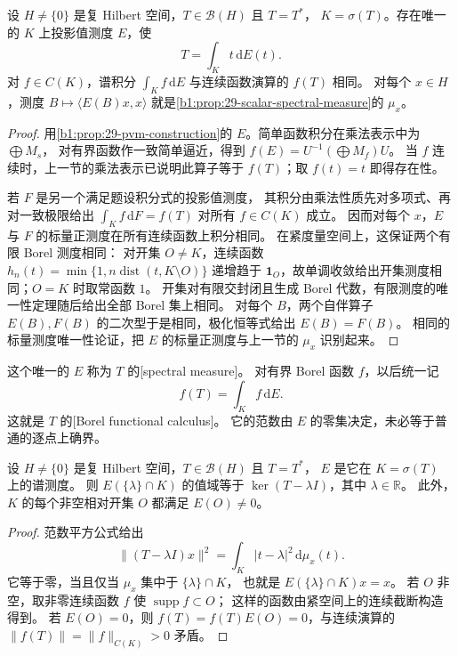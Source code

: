 \begin{theorem}[有界自伴算子的谱测度]
\label{b1:thm:29-bounded-pvm}
设 \(H\ne\{0\}\) 是复 Hilbert 空间，\(T\in\mathcal B(H)\) 且 \(T=T^*\)，
\(K=\sigma(T)\)。存在唯一的 \(K\) 上投影值测度 \(E\)，使
\[
 T=\int_K t\,\mathrm{d}E(t).
\]
对 \(f\in C(K)\)，谱积分 \(\int_K f\,\mathrm{d}E\) 与连续函数演算的 \(f(T)\) 相同。
对每个 \(x\in H\)，测度 \(B\mapsto\langle E(B)x,x\rangle\)
就是\cref{b1:prop:29-scalar-spectral-measure}的 \(\mu_x\)。
\end{theorem}
\begin{proof}
用\cref{b1:prop:29-pvm-construction}的 \(E\)。简单函数积分在乘法表示中为 \(\bigoplus M_s\)，
对有界函数作一致简单逼近，得到 \(f(E)=U^{-1}(\bigoplus M_f)U\)。
当 \(f\) 连续时，上一节的乘法表示已说明此算子等于 \(f(T)\)；取 \(f(t)=t\) 即得存在性。

若 \(F\) 是另一个满足题设积分式的投影值测度，
其积分由乘法性质先对多项式、再对一致极限给出
\(\int_K f\,\mathrm{d}F=f(T)\) 对所有 \(f\in C(K)\) 成立。
因而对每个 \(x\)，\(E\) 与 \(F\) 的标量正测度在所有连续函数上积分相同。
在紧度量空间上，这保证两个有限 Borel 测度相同：
对开集 \(O\ne K\)，连续函数
\(h_n(t)=\min\{1,n\operatorname{dist}(t,K\setminus O)\}\)
递增趋于 \(\mathbf1_O\)，故单调收敛给出开集测度相同；\(O=K\) 时取常函数 \(1\)。
开集对有限交封闭且生成 Borel 代数，有限测度的唯一性定理随后给出全部 Borel 集上相同。
对每个 \(B\)，两个自伴算子 \(E(B),F(B)\) 的二次型于是相同，极化恒等式给出 \(E(B)=F(B)\)。
相同的标量测度唯一性论证，把 \(E\) 的标量正测度与上一节的 \(\mu_x\) 识别起来。
\end{proof}

这个唯一的 \(E\) 称为 \(T\) 的[spectral measure]。
对有界 Borel 函数 \(f\)，以后统一记
\[
 f(T)=\int_K f\,\mathrm{d}E.
\]
这就是 \(T\) 的[Borel functional calculus]。
它的范数由 \(E\) 的零集决定，未必等于普通的逐点上确界。

\begin{proposition}[谱投影与特征空间]
\label{b1:prop:29-eigenprojection}
设 \(H\ne\{0\}\) 是复 Hilbert 空间，\(T\in\mathcal B(H)\) 且 \(T=T^*\)，
\(E\) 是它在 \(K=\sigma(T)\) 上的谱测度。
则 \(E(\{\lambda\}\cap K)\) 的值域等于 \(\ker(T-\lambda I)\)，其中 \(\lambda\in\mathbb R\)。
此外，\(K\) 的每个非空相对开集 \(O\) 都满足 \(E(O)\ne0\)。
\end{proposition}
\begin{proof}
范数平方公式给出
\[
 \|(T-\lambda I)x\|^2=\int_K|t-\lambda|^2\,\mathrm{d}\mu_x(t).
\]
它等于零，当且仅当 \(\mu_x\) 集中于 \(\{\lambda\}\cap K\)，
也就是 \(E(\{\lambda\}\cap K)x=x\)。
若 \(O\) 非空，取非零连续函数 \(f\) 使 \(\operatorname{supp}f\subset O\)；
这样的函数由紧空间上的连续截断构造得到。
若 \(E(O)=0\)，则 \(f(T)=f(T)E(O)=0\)，与连续演算的
\(\|f(T)\|=\|f\|_{C(K)}>0\) 矛盾。
\end{proof}

